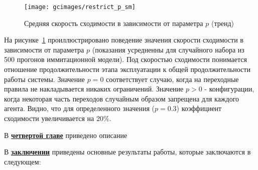 \begin{figure}
    \centering
    \texttt{[image: gcimages/restrict\_p\_sm]}
    \caption{Средняя скорость сходимости в зависимости от параметра $p$ (тренд)}
    \label{fig:restrict_profit}
\end{figure}

На рисунке~\ref{fig:restrict_profit} проиллюстрировано поведение значения скорости сходимости в зависимости от параметра $p$ (показания усредненны для случайного набора из 500 прогонов иммитационной модели). Под скоростью сходимости понимается отношение продолжительности этапа эксплуатации к общей продолжительности работы системы. Значение $p = 0$ соответствует случаю, когда на переходные правила не накладывается никаких ограничений. Значение $p>0$ - конфигурации, когда некоторая часть переходов случайным образом запрещена для каждого агента. Видно, что для определенного значения ($p=0.3$) коэффициент сходимости увеличивается на $20\%$.




В \underline{\textbf{четвертой главе}} приведено описание


В \underline{\textbf{заключении}} приведены основные результаты работы, которые заключаются в следующем:




